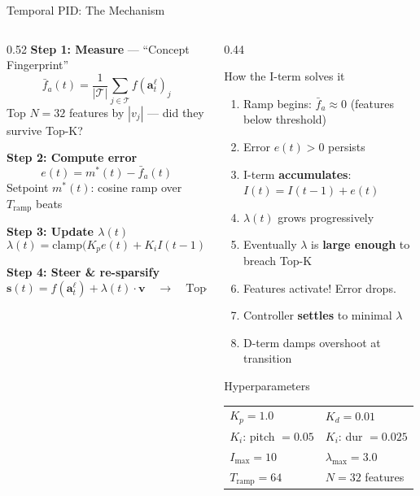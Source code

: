 \documentclass[aspectratio=169, 11pt]{beamer}
\begin{document}
\begin{frame}{Temporal PID: The Mechanism}

\begin{columns}[T]
\begin{column}{0.52\textwidth}
\textbf{Step 1: Measure} --- ``Concept Fingerprint''
$$\bar{f}_a(t) = \frac{1}{|\mathcal{T}|} \sum_{j \in \mathcal{T}} f(\mathbf{a}_t^\ell)_j$$
{\small Top $N{=}32$ features by $|v_j|$ --- did they survive Top-K?}

\vspace{0.4em}
\textbf{Step 2: Compute error}
$$e(t) = m^*(t) - \bar{f}_a(t)$$
{\small Setpoint $m^*(t)$: cosine ramp over $T_\text{ramp}$ beats}

\vspace{0.4em}
\textbf{Step 3: Update $\lambda(t)$}
$$\lambda(t) = \text{clamp}\Big(K_p e(t) + K_i I(t{-}1) + K_d \Delta e\Big)$$

\vspace{0.4em}
\textbf{Step 4: Steer \& re-sparsify}
$$\mathbf{s}(t) = f(\mathbf{a}_t^\ell) + \lambda(t) \cdot \mathbf{v} \quad\to\quad \text{Top-K}(\mathbf{s}(t))$$
\end{column}

\begin{column}{0.44\textwidth}
\begin{exampleblock}{How the I-term solves it}
\small
\begin{enumerate}
  \item Ramp begins: $\bar{f}_a \approx 0$ (features below threshold)
  \item Error $e(t) > 0$ persists
  \item I-term \textbf{accumulates}: $I(t) = I(t{-}1) + e(t)$
  \item $\lambda(t)$ grows progressively
  \item Eventually $\lambda$ is \textbf{large enough} to breach Top-K
  \item Features activate! Error drops.
  \item Controller \textbf{settles} to minimal $\lambda$
  \item D-term damps overshoot at transition
\end{enumerate}
\end{exampleblock}

\vspace{0.3em}
\begin{block}{Hyperparameters}
\small
\begin{tabular}{ll}
$K_p = 1.0$ & $K_d = 0.01$ \\
$K_i$: pitch $= 0.05$ & $K_i$: dur $= 0.025$ \\
$I_\text{max} = 10$ & $\lambda_\text{max} = 3.0$ \\
$T_\text{ramp} = 64$ & $N = 32$ features \\
\end{tabular}
\end{block}
\end{column}
\end{columns}


\end{frame}
\end{document}
